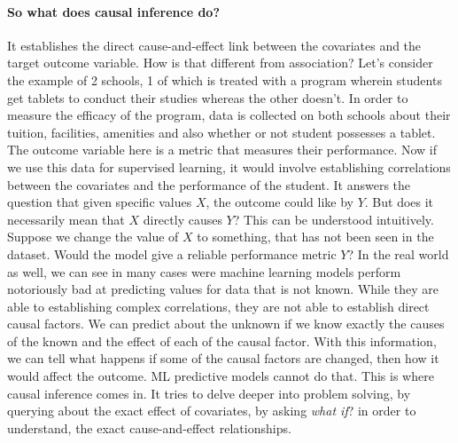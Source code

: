\documentclass{article}
\begin{document}
\paragraph{So what does causal inference do?}{
It establishes the direct cause-and-effect link between the covariates and the target outcome variable.
How is that different from association? Let's consider the example of 2 schools, 1 of which is treated with a program wherein students 
get tablets to conduct their studies whereas the other doesn't. In order to measure the efficacy of the program, data is collected on both
schools about their tuition, facilities, amenities and also whether or not student possesses a tablet. The outcome variable here is a 
metric that measures their performance. Now if we use this data for supervised learning, it would involve establishing correlations between
the covariates and the performance of the student. It answers the question that given specific values $X$, the outcome could like by $Y$.
But does it necessarily mean that $X$ directly causes $Y$? This can be understood intuitively. Suppose we change the value of $X$ to something,
that has not been seen in the dataset. Would the model give a reliable performance metric $Y$? In the real world as well, we can see in
many cases were machine learning models perform notoriously bad at predicting values for data that is not known. While they are able to
establishing complex correlations, they are not able to establish direct causal factors. We can predict about the unknown if we know exactly
the causes of the known and the effect of each of the causal factor. With this information, we can tell what happens if some of the causal
factors are changed, then how it would affect the outcome. ML predictive models cannot do that. This is where causal inference comes in. It
tries to delve deeper into problem solving, by querying about the exact effect of covariates, by asking \textit{what if}? in order to understand,
the exact cause-and-effect relationships.}
\end{document}
